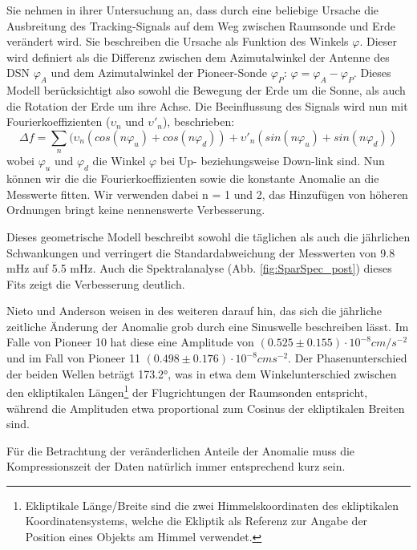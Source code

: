 Sie nehmen in ihrer Untersuchung an, dass durch eine beliebige Ursache die Ausbreitung des Tracking-Signals auf
dem Weg zwischen Raumsonde und Erde verändert wird. Sie beschreiben die Ursache als Funktion des Winkels $\varphi$. Dieser wird definiert als die Differenz zwischen dem Azimutalwinkel der Antenne des DSN $\varphi_A$ und dem Azimutalwinkel der Pioneer-Sonde $\varphi_P$: $\varphi=\varphi_A-\varphi_P$. %
Dieses Modell berücksichtigt also sowohl die Bewegung der Erde um die Sonne, als auch die Rotation der Erde um ihre Achse.
Die Beeinflussung des Signals wird nun mit Fourierkoeffizienten ($\upsilon_n$ und $\upsilon'_n$), beschrieben:
\begin{equation}
\Delta f = \sum_n (\upsilon_n(cos(n\varphi_u)+cos(n\varphi_d))+\upsilon'_n(sin(n\varphi_u)+sin(n\varphi_d))
\end{equation}
wobei $\varphi_u$ und $\varphi_d$ die Winkel $\varphi$ bei Up- beziehungsweise Down-link sind.
Nun können wir die die Fourierkoeffizienten sowie die konstante Anomalie an die Messwerte fitten. Wir verwenden dabei n = 1 und 2, das Hinzufügen von höheren Ordnungen bringt keine nennenswerte Verbesserung.

Dieses geometrische Modell beschreibt sowohl die täglichen als auch die jährlichen
Schwankungen und verringert die Standardabweichung der Messwerten von 9.8 mHz auf 5.5 mHz.
Auch die Spektralanalyse (Abb. \ref{fig:SparSpec_post}) dieses Fits zeigt die Verbesserung deutlich\cite{Levy2008}. %

Nieto und Anderson weisen in \cite{Nieto2005} des weiteren darauf hin, das sich die jährliche zeitliche Änderung der Anomalie %
grob durch eine Sinuswelle beschreiben lässt. Im Falle von Pioneer 10 hat diese eine Amplitude von $(0.525\pm0.155)\cdot10^{-8}cm/s^{-2}$ und im Fall von Pioneer 11 $(0.498\pm0.176)\cdot10^{-8}cms^{-2}$. Der Phasenunterschied der beiden Wellen beträgt 173.2°, was in etwa dem Winkelunterschied zwischen den ekliptikalen Längen\footnote{Ekliptikale Länge/Breite sind die zwei Himmelskoordinaten des ekliptikalen Koordinatensystems, welche die Ekliptik als Referenz zur Angabe der Position eines Objekts am Himmel verwendet.} der Flugrichtungen der Raumsonden entspricht, während die Amplituden etwa proportional zum Cosinus der ekliptikalen Breiten sind.

Für die Betrachtung der veränderlichen Anteile der Anomalie muss die Kompressionszeit der Daten natürlich immer entsprechend kurz sein\cite{Nieto2005}.